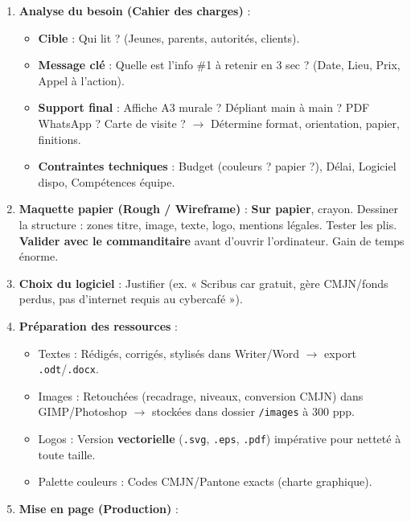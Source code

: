 \documentclass[11pt]{article}
\begin{document}
\begin{methode}
\begin{enumerate}
    \item \textbf{Analyse du besoin (Cahier des charges)} : 
        \begin{itemize}
            \item \textbf{Cible} : Qui lit ? (Jeunes, parents, autorités, clients).
            \item \textbf{Message clé} : Quelle est l'info \#1 à retenir en 3 sec ? (Date, Lieu, Prix, Appel à l'action).
            \item \textbf{Support final} : Affiche A3 murale ? Dépliant main à main ? PDF WhatsApp ? Carte de visite ? $\rightarrow$ Détermine format, orientation, papier, finitions.
            \item \textbf{Contraintes techniques} : Budget (couleurs ? papier ?), Délai, Logiciel dispo, Compétences équipe.
        \end{itemize}
    \item \textbf{Maquette papier (Rough / Wireframe)} : \textbf{Sur papier}, crayon. Dessiner la structure : zones titre, image, texte, logo, mentions légales. Tester les plis. \textbf{Valider avec le commanditaire} avant d'ouvrir l'ordinateur. Gain de temps énorme.
    \item \textbf{Choix du logiciel} : Justifier (ex. « Scribus car gratuit, gère CMJN/fonds perdus, pas d'internet requis au cybercafé »).
    \item \textbf{Préparation des ressources} : 
        \begin{itemize}
            \item Textes : Rédigés, corrigés, stylisés dans Writer/Word $\rightarrow$ export \texttt{.odt}/\texttt{.docx}.
            \item Images : Retouchées (recadrage, niveaux, conversion CMJN) dans GIMP/Photoshop $\rightarrow$ stockées dans dossier \texttt{/images} à 300 ppp.
            \item Logos : Version \textbf{vectorielle} (\texttt{.svg}, \texttt{.eps}, \texttt{.pdf}) impérative pour netteté à toute taille.
            \item Palette couleurs : Codes CMJN/Pantone exacts (charte graphique).
        \end{itemize}
    \item \textbf{Mise en page (Production)} : 
        \begin{enumerate}

\end{enumerate}
\end{enumerate}
\end{methode}
\end{document}
